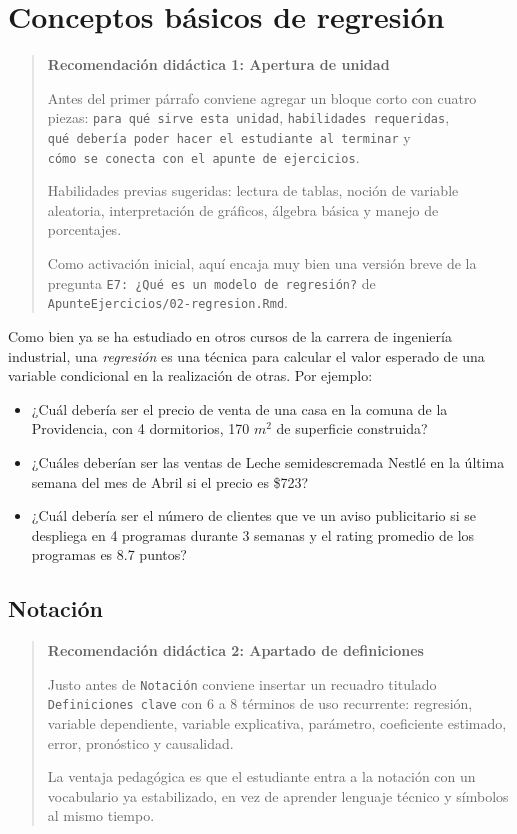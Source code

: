 \documentclass[
]{book}
\providecommand{\tightlist}{%
  \setlength{\itemsep}{0pt}\setlength{\parskip}{0pt}}
\begin{document}
\section{Conceptos básicos de regresión}\label{conceptos-buxe1sicos-de-regresiuxf3n-1}

\begin{quote}
\textbf{Recomendación didáctica 1: Apertura de unidad}

Antes del primer párrafo conviene agregar un bloque corto con cuatro
piezas: \texttt{para\ qué\ sirve\ esta\ unidad}, \texttt{habilidades\ requeridas},
\texttt{qué\ debería\ poder\ hacer\ el\ estudiante\ al\ terminar} y \texttt{cómo\ se\ conecta\ con\ el\ apunte\ de\ ejercicios}.

Habilidades previas sugeridas: lectura de tablas, noción de variable
aleatoria, interpretación de gráficos, álgebra básica y manejo de
porcentajes.

Como activación inicial, aquí encaja muy bien una versión breve de la
pregunta \texttt{E7:\ ¿Qué\ es\ un\ modelo\ de\ regresión?} de
\texttt{ApunteEjercicios/02-regresion.Rmd}.
\end{quote}

Como bien ya se ha estudiado en otros cursos de la carrera de ingeniería
industrial, una \emph{regresión} es una técnica para calcular el valor
esperado de una variable condicional en la realización de otras. Por
ejemplo:

\begin{itemize}
\tightlist
\item
  ¿Cuál debería ser el precio de venta de una casa en la comuna de la
  Providencia, con 4 dormitorios, 170 \(m^2\) de superficie construida?
\item
  ¿Cuáles deberían ser las ventas de Leche semidescremada Nestlé en la
  última semana del mes de Abril si el precio es \$723?
\item
  ¿Cuál debería ser el número de clientes que ve un aviso publicitario
  si se despliega en 4 programas durante 3 semanas y el rating
  promedio de los programas es 8.7 puntos?
\end{itemize}

\subsection{Notación}\label{notaciuxf3n-1}

\begin{quote}
\textbf{Recomendación didáctica 2: Apartado de definiciones}

Justo antes de \texttt{Notación} conviene insertar un recuadro titulado
\texttt{Definiciones\ clave} con 6 a 8 términos de uso recurrente:
regresión, variable dependiente, variable explicativa, parámetro,
coeficiente estimado, error, pronóstico y causalidad.

La ventaja pedagógica es que el estudiante entra a la notación con un
vocabulario ya estabilizado, en vez de aprender lenguaje técnico y
símbolos al mismo tiempo.
\end{quote}
\end{document}
